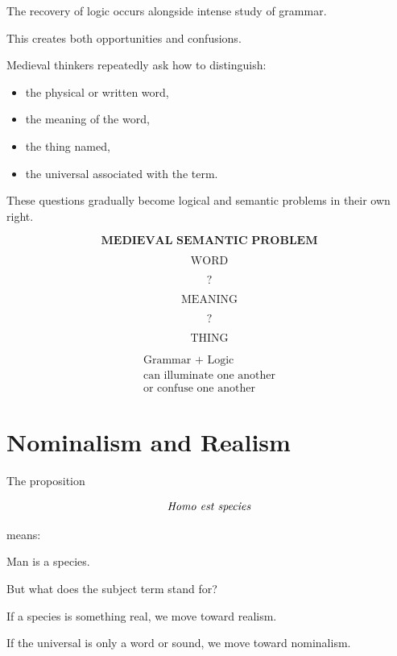 \documentclass[11pt]{article}
\newcommand{\latin}[1]{\textit{#1}}
\begin{document}
The recovery of logic occurs alongside intense study of grammar.

This creates both opportunities and confusions.

Medieval thinkers repeatedly ask how to distinguish:

\begin{itemize}
    \item the physical or written word,
    \item the meaning of the word,
    \item the thing named,
    \item the universal associated with the term.
\end{itemize}

These questions gradually become logical and semantic problems in
their own right.

\begin{whiteboard}
\[
\textbf{MEDIEVAL SEMANTIC PROBLEM}
\]

\[
\text{WORD}
\]

\[
?
\]

\[
\text{MEANING}
\]

\[
?
\]

\[
\text{THING}
\]

\[
\boxed{
\begin{array}{c}
\text{Grammar + Logic}\\
\text{can illuminate one another}\\
\text{or confuse one another}
\end{array}
}
\]
\end{whiteboard}

\section{Nominalism and Realism}

The proposition

\[
\text{\latin{Homo est species}}
\]

means:

\begin{center}
Man is a species.
\end{center}

But what does the subject term stand for?

If a species is something real, we move toward realism.

If the universal is only a word or sound, we move toward
nominalism.
\end{document}
